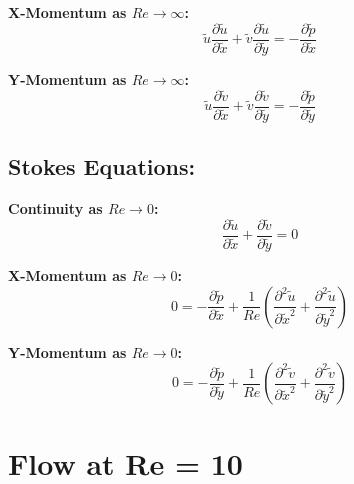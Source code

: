 \documentclass[11pt]{article}
\begin{document}
\textbf{X-Momentum as $Re \rightarrow \infty$:}
\[
\tilde{u} \frac{\partial \tilde{u}}{\partial \tilde{x}} + \tilde{v} \frac{\partial \tilde{u}}{\partial \tilde{y}} = -\frac{\partial \tilde{p}}{\partial \tilde{x}}
\]

\vspace{2.5mm}

\textbf{Y-Momentum as $Re \rightarrow \infty$:}
\[
\tilde{u} \frac{\partial \tilde{v}}{\partial \tilde{x}} + \tilde{v} \frac{\partial \tilde{v}}{\partial \tilde{y}} = -\frac{\partial \tilde{p}}{\partial \tilde{y}}
\]

\vspace{5mm}

\subsection*{Stokes Equations:}


\vspace{5mm}

\textbf{Continuity as $Re \rightarrow 0$:}
\[
\frac{\partial \tilde{u}}{\partial \tilde{x}} + \frac{\partial \tilde{v}}{\partial \tilde{y}} = 0
\]

\vspace{2.5mm}

\textbf{X-Momentum as $Re \rightarrow 0$:}
\[
0 = -\frac{\partial \tilde{p}}{\partial \tilde{x}} + \frac{1}{Re} \left( \frac{\partial^2 \tilde{u}}{\partial \tilde{x}^2} + \frac{\partial^2 \tilde{u}}{\partial \tilde{y}^2} \right)
\]

\vspace{2.5mm}

\textbf{Y-Momentum as $Re \rightarrow 0$:}
\[
0 = -\frac{\partial \tilde{p}}{\partial \tilde{y}} + \frac{1}{Re} \left( \frac{\partial^2 \tilde{v}}{\partial \tilde{x}^2} + \frac{\partial^2 \tilde{v}}{\partial \tilde{y}^2} \right)
\]


\pagebreak



\section{Flow at Re = 10}
\end{document}
